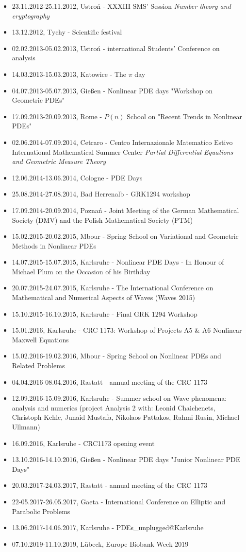 \begin{itemize}
  \item 23.11.2012-25.11.2012, Ustroń - XXXIII SMS' Session \textsl{Number theory and cryptography}
  \item 13.12.2012, Tychy - Scientific festival
  \item 02.02.2013-05.02.2013, Ustroń -  international Students' Conference on analysis
  \item 14.03.2013-15.03.2013, Katowice - The $\pi$ day
  \item 04.07.2013-05.07.2013, Gießen - Nonlinear PDE days "Workshop on Geometric PDEs"
  \item 17.09.2013-20.09.2013, Rome - $P(n)$ School on "Recent Trends in Nonlinear PDEs"
  \item 02.06.2014-07.09.2014, Cetraro -  Centro Internazionale Matematico Estivo International Mathematical Summer Center \textit{Partial Differential Equations and Geometric Measure Theory}
  \item 12.06.2014-13.06.2014, Cologne - PDE Days
  \item 25.08.2014-27.08.2014, Bad Herrenalb - GRK1294 workshop
  \item 17.09.2014-20.09.2014, Poznań - Joint Meeting of the German Mathematical Society (DMV) and the Polish Mathematical Society (PTM)
  \item 15.02.2015-20.02.2015, Mbour - Spring School on Variational and Geometric Methods in Nonlinear PDEs
  \item 14.07.2015-15.07.2015, Karlsruhe - Nonlinear PDE Days - In Honour of Michael Plum on the Occasion of his  Birthday
  \item 20.07.2015-24.07.2015, Karlsruhe - The  International Conference on Mathematical and Numerical Aspects of Waves (Waves 2015)
  \item 15.10.2015-16.10.2015, Karlsruhe - Final GRK 1294 Workshop
  \item 15.01.2016, Karlsruhe - CRC 1173: Workshop of Projects A5 \& A6 Nonlinear Maxwell Equations
  \item 15.02.2016-19.02.2016, Mbour - Spring School on Nonlinear PDEs and Related Problems
  \item 04.04.2016-08.04.2016, Rastatt -  annual meeting of the CRC 1173
  \item 12.09.2016-15.09.2016, Karlsruhe - Summer school on Wave phenomena: analysis and numerics (project Analysis 2 with: Leonid Chaichenets, Christoph Kehle, Junaid Mustafa, Nikolaos Pattakos, Rahmi Rusin, Michael Ullmann)
  \item 16.09.2016, Karlsruhe - CRC1173 opening event
  \item 13.10.2016-14.10.2016,  Gießen - Nonlinear PDE days "Junior Nonlinear PDE Days"
  \item 20.03.2017-24.03.2017, Rastatt -  annual meeting of the CRC 1173
  \item 22-05.2017-26.05.2017, Gaeta - International Conference on Elliptic and Parabolic Problems
  \item 13.06.2017-14.06.2017, Karlsruhe - PDEs\_unplugged@Karlsruhe
  \item 07.10.2019-11.10.2019, Lübeck, Europe Biobank Week 2019
\end{itemize}

